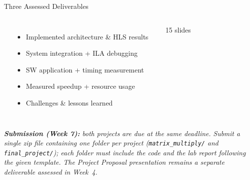 \documentclass[10pt,aspectratio=169]{beamer}
\begin{document}
\begin{frame}{Three Assessed Deliverables}
\begin{columns}[T,totalwidth=\textwidth]
\column{\dimexpr\textwidth/3\relax}
\colorbox{Teal}{}\\[-1pt]
\colorbox{Teal!80}{}
\vspace{3pt}

\begin{itemize}\small\color{TxtMd}
  \item Implemented architecture \& HLS results
  \item System integration + ILA debugging
  \item SW application + timing measurement
  \item Measured speedup + resource usage
  \item Challenges \& lessons learned
\end{itemize}

\vspace{6pt}
\colorbox{Teal}{}
\textcolor{TxtMd}{\small\ \ 15 slides}

\end{columns}

\vspace{0.25cm}
{\small\color{TxtMd}\itshape
  \textbf{Submission (Week 7):} both projects are due at the same deadline.
  Submit a single zip file containing one folder per project
  (\texttt{matrix\_multiply/} and \texttt{final\_project/});
  each folder must include the code and the lab report following the given template.
  The Project Proposal presentation remains a separate deliverable assessed in Week~4.}
\end{frame}
\end{document}

